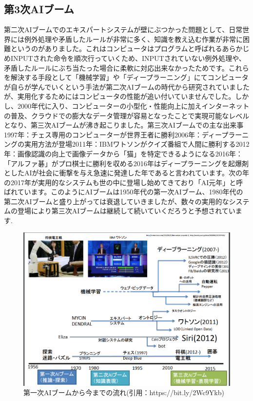 \subsection{第3次AIブーム}
第二次AIブームでのエキスパートシステムが壁にぶつかった問題として、日常世界には例外処理や矛盾したルールが非常に多く、知識を教え込む作業が非常に困難というのがありました。これはコンピュータはプログラムと呼ばれるあらかじめINPUTされた命令を順次行っていくため、INPUTされていない例外処理や、矛盾したルールにぶち当たった場合に柔軟に対応出来なかったためです。これらを解決する手段として「機械学習」や「ディープラーニング」にてコンピュータが自らが学んでいくという手法が第二次AIブームの時代から研究されていましたが、実用化するためにはコンピュータの性能が追い付いていませんでした。しかし、2000年代に入り、コンピューターの小型化・性能向上に加えインターネットの普及、クラウドでの膨大なデータ管理が容易となったことで実現可能なレベルとなり、第三次AIブームが沸き起こりました。第三次AIブームでの主な出来事1997年：チェス専用のコンピューターが世界王者に勝利2006年：ディープラーニングの実用方法が登場2011年：IBMワトソンがクイズ番組で人間に勝利する2012年：画像認識の向上で画像データから「猫」を特定できるようになる2016年：「アルファ碁」がプロ棋士に勝利を収める2016年はディープラーニングを起爆剤としたAIが社会に衝撃を与え急速に発達した年であると言われています。次の年の2017年が実用的なシステムも世の中に登場し始めてきており「AI元年」と呼ばれています。このようにAIブームは1950年代の第一次AIブーム、1980年代の第二次AIブームと盛り上がっては衰退していきましたが、数々の実用的なシステムの登場により第三次AIブームは継続して続いていくだろうと予想されています.\\
\begin{figure}[!ht]
    \begin{screen}
    \begin{center}
        \includegraphics[scale=0.4, clip]{./img/AI_History.png}
        \caption{第一次AIブームから今までの流れ\newline(引用：https://bit.ly/2Wc9Ykb)}
        \label{fig:第一次AIブームから今までの流れ}
    \end{center}
\end{screen}
\end{figure}\\
